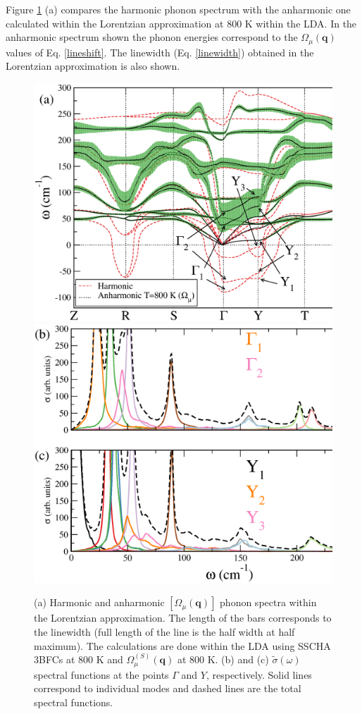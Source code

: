 Figure \ref{lw-sns} (a) compares the harmonic phonon spectrum with the anharmonic one calculated within the Lorentzian approximation at $800$ K within the LDA. In the anharmonic spectrum shown the phonon energies correspond to
the $\Omega_{\mu}(\mathbf{q})$ values of Eq. \ref{lineshift}. The linewidth (Eq. \ref{linewidth}) obtained in the Lorentzian approximation is also shown.
\begin{figure}[h]
\begin{center}
\includegraphics[width=0.8\linewidth]{Figures/phonon-sns.eps}
\includegraphics[width=0.8\linewidth]{Figures/spf-sns.eps}
\caption[Phonons within the Lorentzian approximation in SnS.]{(a) Harmonic and anharmonic $[\Omega_{\mu}(\mathbf{q})]$ phonon spectra within the Lorentzian approximation. The length of the bars corresponds to the linewidth (full 
	length of the line is the half width at half maximum). The calculations are done within the LDA using SSCHA 3BFCs at $800$ K and $\Omega^{(S)}_{\mu}(\mathbf{q})$ at $800$ K. (b) and (c) $\tilde{\sigma}(\omega)$ spectral functions at 
the points $\Gamma$ and $Y$, respectively. Solid lines correspond to individual modes and dashed lines are the total spectral functions.}
\label{lw-sns}
\end{center}
\end{figure}
